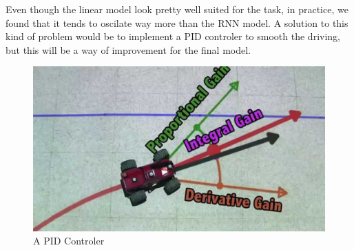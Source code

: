 Even though the linear model look pretty well suited for the task, in practice, we found that it tends to oscilate way more than the RNN model. A solution to this kind of problem would be to implement a PID controler to smooth the driving, but this will be a way of improvement for the final model. 
\clearpage
\begin{figure}[H]
\centering
\includegraphics[scale=0.3]{img/PID.jpeg}
\caption{A PID Controler}
\end{figure}









\clearpage

